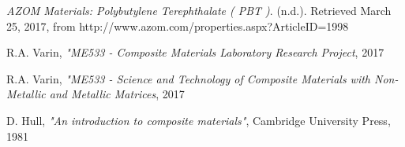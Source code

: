 \documentclass[11pt]{article}
\begin{document}
\newpage
\begin{thebibliography}{9}

\textit{AZOM Materials: Polybutylene Terephthalate ( PBT )}. (n.d.). Retrieved March 25, 2017, from http://www.azom.com/properties.aspx?ArticleID=1998

R.A. Varin, \textit{"ME533 - Composite Materials Laboratory Research Project}, 2017

R.A. Varin, \textit{"ME533 - Science and Technology of Composite Materials with Non-Metallic and Metallic Matrices}, 2017

D. Hull, \textit{"An introduction to composite materials"}, Cambridge University Press, 1981

\end{thebibliography}
\end{document}

